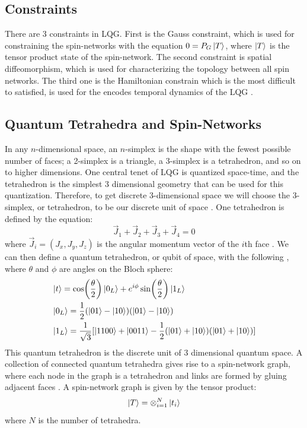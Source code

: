 \documentclass[a4paper,11pt,aps,tightenlines,nofootinbib]{revtex4}
\begin{document}
\subsection{Constraints}
        There are 3 constraints in LQG. First is the Gauss constraint, which is used for constraining the spin-networks with the 
        equation $0=P_G \ket{T}$, where $\ket{T}$ is the tensor product state of the spin-network.
        The second constraint is spatial diffeomorphism, which is used for characterizing the topology between all spin networks. 
        The third one is the Hamiltonian constrain which 
        is the most difficult to satisfied, is used for the encodes temporal dynamics of the LQG \cite{diffeo}. 


\subsection{Quantum Tetrahedra and Spin-Networks}
        In any $n$-dimensional space, an $n$-simplex is the shape with the fewest possible number of faces; a 
        2-simplex is a triangle, a 3-simplex is a tetrahedron, and so on to higher dimensions. One central tenet 
        of LQG is quantized space-time, and the tetrahedron is the simplest 3 dimensional geometry that can be used for this quantization. %
        Therefore, to get discrete 3-dimensional space 
        we will choose the 3-simplex, or tetrahedron, to be our discrete unit of space \cite{simplical-decomp}. One tetrahedron is defined by the 
        equation: 
        \begin{equation} 
                \vec J_1 + \vec J_2 + \vec J_3 + \vec J_4 = 0
        \end{equation}
        where $\vec J_i = (J_x,J_y,J_z)$ is the angular momentum vector of the $i$th face \cite{covariant-lqg}. We can then define 
        a quantum tetrahedron, or qubit of space, with the following \cite{qspacetime-on-qsim}, where $\theta$ and $\phi$ are 
        angles on the Bloch sphere: 
        \begin{align}
                &\ket{t} = \cos(\frac{\theta}{2})\ket{0_L} + e^{i\phi}\sin(\frac{\theta}{2}) \ket{1_L}\\
                &\ket{0_L} = \frac{1}{2}(\ket{01}-\ket{10})(\ket{01}-\ket{10})\\
                &\ket{1_L} = \frac{1}{\sqrt{3}}[\ket{1100}+\ket{0011}-\frac{1}{2}(\ket{01}+\ket{10})(\ket{01}+\ket{10})]
        \end{align}
        This quantum tetrahedron is the discrete unit of 3 dimensional quantum space.
        A collection of connected quantum tetrahedra gives rise to a spin-network graph, where each node in the graph is a tetrahedron and links are formed by gluing adjacent faces \cite{gluing-polyhedra}. 
        A spin-network graph is given by the tensor product: 
        \begin{equation}
                \ket{T} = \otimes_{i=1}^N\ket{t_i}
        \end{equation}
        where $N$ is the number of tetrahedra.
\end{document}
